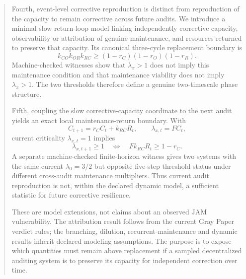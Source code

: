 \documentclass[11pt]{article}
\begin{document}
\begin{abstract}
Fourth, event-level corrective reproduction is distinct from reproduction of the capacity to remain corrective across future audits. We introduce a minimal slow return-loop model linking independently corrective capacity, observability or attribution of genuine maintenance, and resources returned to preserve that capacity. Its canonical three-cycle replacement boundary is
\[
k_{CO}k_{OR}k_{RC}\ge(1-r_C)(1-r_O)(1-r_R).
\]
Machine-checked witnesses show that \(\lambda_x>1\) does not imply this maintenance condition and that maintenance viability does not imply \(\lambda_x>1\). The two thresholds therefore define a genuine two-timescale phase structure.

Fifth, coupling the slow corrective-capacity coordinate to the next audit yields an exact local maintenance-return boundary. With
\[
C_{t+1}=r_CC_t+k_{RC}R_t,
\qquad
\lambda_{x,t}=FC_t,
\]
current criticality \(\lambda_{x,t}=1\) implies
\[
\lambda_{x,t+1}\ge1
\quad\Longleftrightarrow\quad
Fk_{RC}R_t\ge1-r_C.
\]
A separate machine-checked finite-horizon witness gives two systems with the same current \(\lambda_0=3/2\) but opposite five-step threshold status under different cross-audit maintenance multipliers. Thus current audit reproduction is not, within the declared dynamic model, a sufficient statistic for future corrective resilience.

These are model extensions, not claims about an observed JAM vulnerability. The attribution result follows from the current Gray Paper verdict rules; the branching, dilution, recurrent-maintenance and dynamic results inherit declared modeling assumptions. The purpose is to expose which quantities must remain above replacement if a sampled decentralized auditing system is to preserve its capacity for independent correction over time.
\end{abstract}












\printbibliography
\end{document}
